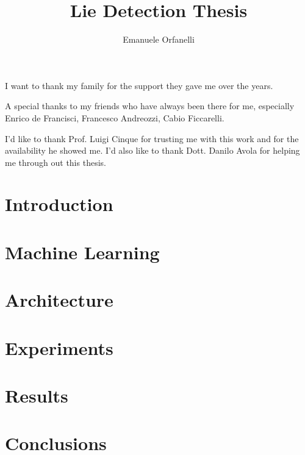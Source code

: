 \documentclass[LaM,binding=0.6cm,english,noexaminfo]{sapthesis}
\title{Lie Detection Thesis}
\author{Emanuele Orfanelli}
\begin{document}
\frontmatter

\maketitle

\dedication{Dedicated to\\ my Family and Friends}

\begin{acknowledgments}
I want to thank my family for the support they gave me over the years.

A special thanks to my friends who have always been there for me, especially Enrico de Francisci, Francesco Andreozzi, Cabio Ficcarelli.

I'd like to thank Prof. Luigi Cinque for trusting me with this work and for the availability he showed me. I'd also like to thank Dott. Danilo Avola for helping me through out this thesis. 

\end{acknowledgments}

\tableofcontents



\mainmatter

\chapter{Introduction}


\chapter{Machine Learning}


\chapter{Architecture}


\chapter{Experiments}


\chapter{Results}


\chapter{Conclusions}


\backmatter

\printbibliography

\listoffigures

\cleardoublepage
\end{document}
